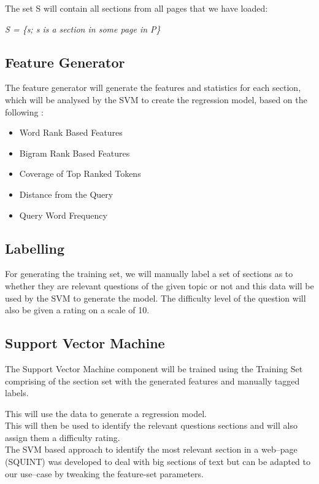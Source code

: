 The set S will contain all sections from all pages that we have loaded: 

\textit{S = \{s; s is a section in some page in P\}}

\subsection{Feature Generator}

The feature generator will generate the features and statistics for each section, which will be analysed by the SVM to create the regression model, based on the following : 

\begin{itemize}
	\item Word Rank Based Features
	\item Bigram Rank Based Features
	\item Coverage of Top Ranked Tokens
	\item Distance from the Query
	\item Query Word Frequency
\end{itemize}

\subsection{Labelling}

For generating the training set, we will manually label a set of sections as to whether they are relevant questions of the given topic or not and this data will be used by the SVM to generate the model. The difficulty level of the question will also be given a rating on a scale of 10.

\subsection{Support Vector Machine}

The Support Vector Machine component will be trained using the Training Set comprising of the section set with the generated features and manually tagged labels. 

This will use the data to generate a regression model. \\

This will then be used to identify the relevant questions sections and will also assign them a difficulty rating. \\

The SVM based approach to identify the most relevant section in a web--page (SQUINT) \cite{squint} was developed to deal with big sections of text but can be adapted to our use--case by tweaking the feature-set parameters. 


